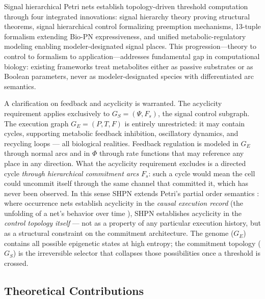 \documentclass[10pt,letterpaper]{article}
\begin{document}
Signal hierarchical Petri nets establish topology-driven threshold computation
through four integrated innovations: signal hierarchy theory proving structural
theorems, signal hierarchical control formalizing preemption mechanisms,
13-tuple formalism extending Bio-PN expressiveness, and unified
metabolic-regulatory modeling enabling modeler-designated signal places.
This progression---theory to control to formalism to application---addresses
fundamental gap in computational biology: existing frameworks treat metabolites
either as passive substrates or as Boolean parameters, never as
modeler-designated species with differentiated arc semantics.

A clarification on feedback and acyclicity is warranted. The acyclicity
requirement applies exclusively to $G_S = (\Psi, F_s)$, the signal control
subgraph. The execution graph $G_E = (P, T, F)$ is entirely unrestricted: it
may contain cycles, supporting metabolic feedback inhibition, oscillatory
dynamics, and recycling loops --- all biological realities. Feedback regulation
is modeled in $G_E$ through normal arcs and in $\Phi$ through rate functions
that may reference any place in any direction. What the acyclicity requirement
excludes is a directed cycle \textit{through hierarchical commitment arcs}
$F_s$: such a cycle would mean the cell could uncommit itself through the
same channel that committed it, which has never been observed. In this sense
SHPN extends Petri's partial order semantics \cite{nielsen1981}: where
occurrence nets establish acyclicity in the \textit{causal execution record}
(the unfolding of a net's behavior over time \cite{winskel1987}), SHPN
establishes acyclicity in the \textit{control topology itself} --- not as a
property of any particular execution history, but as a structural constraint
on the commitment architecture. The genome ($G_E$) contains all possible
epigenetic states at high entropy; the commitment topology ($G_S$) is the
irreversible selector that collapses those possibilities once a threshold is
crossed.

\subsection{Theoretical Contributions}
\end{document}
